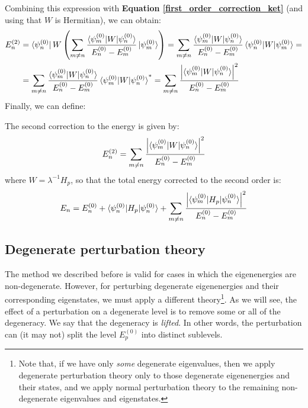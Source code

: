 Combining this expression with \textbf{Equation \ref{first_order_correction_ket}} (and using that $W$ is Hermitian), we can obtain:
\begin{equation}
    \begin{split}
        E_n^{(2)} &= \bra{\psi_n^{(0)}}W \left(\sum_{m\neq n} \frac{\braket{\psi_m^{(0)}|W|\psi_n^{(0)}}}{E_n^{(0)} - E_m^{(0)}}\ket{\psi_m^{(0)}}\right) = \sum_{m\neq n} \frac{\braket{\psi_m^{(0)}|W|\psi_n^{(0)}}}{E_n^{(0)} - E_m^{(0)}}\braket{\psi_n^{(0)}|W|\psi_m^{(0)}} = \\
        &= \sum_{m\neq n} \frac{\braket{\psi_m^{(0)}|W|\psi_n^{(0)}}}{E_n^{(0)} - E_m^{(0)}}\braket{\psi_m^{(0)}|W|\psi_n^{(0)}}^* = \sum_{m\neq n} \frac{\left|\braket{\psi_m^{(0)}|W|\psi_n^{(0)}}\right|^2}{E_n^{(0)} - E_m^{(0)}} \\
    \end{split}
\end{equation}
Finally, we can define:
\begin{definition}
    The second correction to the energy is given by:
    \begin{equation}
        E_n^{(2)} = \sum_{m\neq n} \frac{\left|\braket{\psi_m^{(0)}|W|\psi_n^{(0)}}\right|^2}{E_n^{(0)} - E_m^{(0)}}
    \end{equation}
    where $W = \lambda^{-1}H_p$, so that the total energy corrected to the second order is:
    \begin{equation}
        E_n = E_n^{(0)} + \braket{\psi_n^{(0)}|H_p|\psi_n^{(0)}} + \sum_{m\neq n} \frac{\left|\braket{\psi_m^{(0)}|H_p|\psi_n^{(0)}}\right|^2}{E_n^{(0)} - E_m^{(0)}}
    \end{equation}
\end{definition}

\subsection{Degenerate perturbation theory}

The method we described before is valid for cases in which the eigenenergies are non-degenerate. However, for perturbing degenerate eigenenergies and their corresponding eigenstates, we must apply a different theory\footnote{Note that, if we have only \textit{some} degenerate eigenvalues, then we apply degenerate perturbation theory only to those degenerate eigenenergies and their states, and we apply normal perturbation theory to the remaining non-degenerate eigenvalues and eigenstates.}. %
As we will see, the effect of a perturbation on a degenerate level is to remove some or all of the degeneracy. We say that the degeneracy is \textit{lifted}. In other words, the perturbation can (it may not) split the level $E_p^{(0)}$ into distinct sublevels. 

